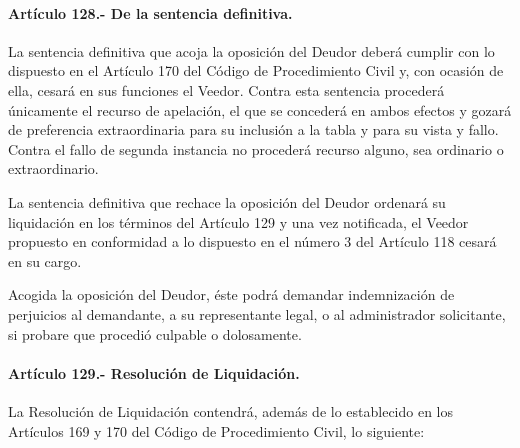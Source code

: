 \documentclass[
]{book}
\begin{document}
\hypertarget{artuxedculo-128.--de-la-sentencia-definitiva.}{%
\paragraph*{Artículo 128.- De la sentencia definitiva.}\label{artuxedculo-128.--de-la-sentencia-definitiva.}}

La sentencia definitiva que acoja la oposición del Deudor deberá cumplir con lo dispuesto en el Artículo 170 del Código de Procedimiento Civil y, con ocasión de ella, cesará en sus funciones el Veedor. Contra esta sentencia procederá únicamente el recurso de apelación, el que se concederá en ambos efectos y gozará de preferencia extraordinaria para su inclusión a la tabla y para su vista y fallo. Contra el fallo de segunda instancia no procederá recurso alguno, sea ordinario o extraordinario.

La sentencia definitiva que rechace la oposición del Deudor ordenará su liquidación en los términos del Artículo 129 y una vez notificada, el Veedor propuesto en conformidad a lo dispuesto en el número 3 del Artículo 118 cesará en su cargo.

Acogida la oposición del Deudor, éste podrá demandar indemnización de perjuicios al demandante, a su representante legal, o al administrador solicitante, si probare que procedió culpable o dolosamente.

\hypertarget{artuxedculo-129.--resoluciuxf3n-de-liquidaciuxf3n.}{%
\paragraph{Artículo 129.- Resolución de Liquidación.}\label{artuxedculo-129.--resoluciuxf3n-de-liquidaciuxf3n.}}

La Resolución de Liquidación contendrá, además de lo establecido en los Artículos 169 y 170 del Código de Procedimiento Civil, lo siguiente:
\end{document}
